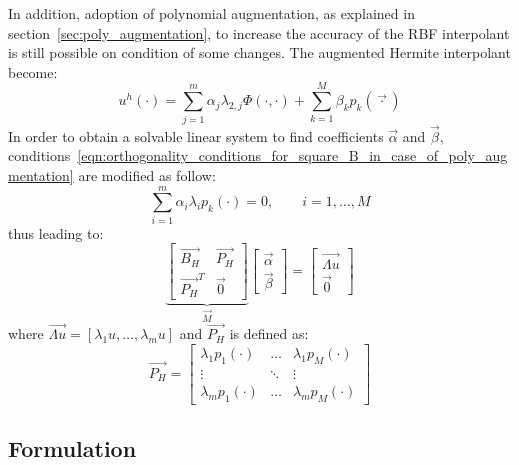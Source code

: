 In addition, adoption of polynomial augmentation, as explained in section~\vref{sec:poly_augmentation}, to increase the accuracy of the RBF interpolant is still possible on condition of some changes. The augmented Hermite interpolant become:
\begin{equation}
	\label{eqn:Hermite_interpolant_plus_polynomial_augmentation}
	u^h(\cdot) = \sum_{j=1}^{m} \alpha_j \lambda_{2,j} \Phi(\cdot,\cdot) + \sum_{k=1}^{M} \beta_k p_k(\vec{\cdot})
\end{equation}
In order to obtain a solvable linear system to find coefficients $\vec{\alpha}$ and $\vec{\beta}$, conditions~\eqref{eqn:orthogonality_conditions_for_square_B_in_case_of_poly_augmentation} are modified as follow:
\begin{equation}
	\label{eqn:orthogonality_conditions_HRBF}
	\sum_{i=1}^{m} \alpha_i \lambda_i p_k(\cdot) = 0, \qquad i=1, \dots, M
\end{equation}
thus leading to:
\begin{equation}
\underbrace{
\begin{bmatrix}
	\vec{B_H}  	 &  \vec{P_H}  \\
	\vec{P_H}^T  &  \vec{0}
\end{bmatrix}}_{\vec{M}}
\begin{bmatrix}
	\vec{\alpha}  \\
	\vec{\beta}
\end{bmatrix} = 
\begin{bmatrix}
	\vec{\Lambda u}  \\
	\vec{0}
\end{bmatrix}
\end{equation}
where $\vec{\Lambda u} = [\lambda_1 u, \dots, \lambda_m u]$ and $\vec{P_H}$ is defined as:
\begin{equation}
\vec{P_H} = 
\begin{bmatrix}
	\lambda_1 p_1(\cdot)  &  \dots  & \lambda_1 p_M(\cdot)  \\
	\vdots				  & \ddots  & \vdots				\\
	\lambda_m p_1(\cdot)  &  \dots  & \lambda_m p_M(\cdot)
\end{bmatrix}
\end{equation}


\subsection{Formulation}

